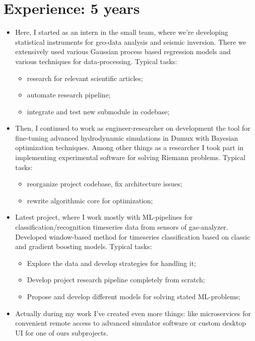 \documentclass[12pt,a4paper,sans]{moderncv}
\begin{document}
\section{Experience: 5 years}
\begin{itemize}
\item Here, I started as an intern in the small team, where we're developing statistical instruments for geo-data analysis and seismic inversion. 
There we extensively used various Gaussian process based regression models and various techniques for data-processing. \newline \newline
Typical tasks: 
 \begin{itemize}
  \item research for relevant scientific articles;
  \item automate research pipeline;
  \item integrate and test new submodule in codebase; \newline
 \end{itemize}
\item Then, I continued to work as engineer-researcher on development the tool for fine-tuning advanced 
hydrodynamic simulations in Dumux with Bayesian optimization techniques.  
Among other things as a researcher I took part in implementing experimental software for solving Riemann problems. \newline \newline
Typical tasks: 
 \begin{itemize}
  \item reorganize project codebase, fix architecture issues;
  \item rewrite algorithmic core for optimization; \newline
 \end{itemize}
\item Latest project, where I work mostly with ML-pipelines for classification/recognition timeseries data from sensors of gas-analyzer.
Developed window-based method for timeseries classification based on classic and gradient boosting models.
\newline \newline
Typical tasks: 
 \begin{itemize}
  \item Explore the data and develop strategies for handling it;
  \item Develop project research pipeline completely from scratch;
  \item Propose and develop different models for solving stated ML-problems; \newline
 \end{itemize}
\item Actually during my work I've created even more things: like microservices for convenient remote access to advanced simulator software or custom desktop UI for one of ours subprojects. \newline
\end{itemize}
\end{document}
